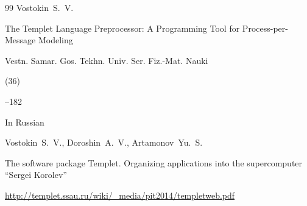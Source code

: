 \begin{thebibliography}{99}
\by Vostokin~S.~V.

\paper The Templet Language Preprocessor: A Programming Tool for Process-per-Message Modeling

\jour Vestn. Samar. Gos. Tekhn. Univ. Ser. Fiz.-Mat. Nauki


(36)

--182




\lang In Russian

\by Vostokin~S.~V., Doroshin~A.~V., Artamonov~Yu.~S.

\preprint The software package Templet. Organizing applications into the supercomputer ``Sergei Korolev''



\elink \url{http://templet.ssau.ru/wiki/_media/pit2014/templetweb.pdf}







\end{thebibliography}





\EngDate



\Russian

\newpage





%

